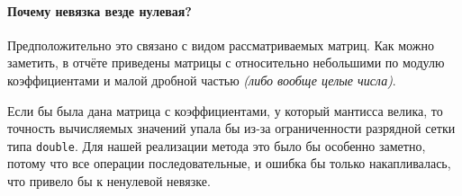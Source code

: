 \paragraph{Почему невязка везде нулевая?} Предположительно это связано с видом рассматриваемых матриц. Как можно заметить, в отчёте приведены матрицы с относительно небольшими по модулю коэффициентами и малой дробной частью \textit{(либо вообще целые числа)}.

Если бы была дана матрица с коэффициентами, у который мантисса велика, то точность вычисляемых значений упала бы из-за ограниченности разрядной сетки типа \texttt{double}. Для нашей реализации метода это было бы особенно заметно, потому что все операции последовательные, и ошибка бы только накапливалась, что привело бы к ненулевой невязке.